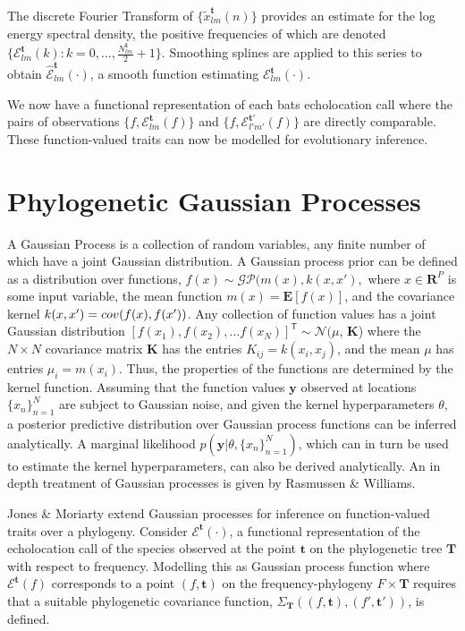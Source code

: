 \documentclass[wsdraft]{ws-rv9x6} %
\begin{document}
The discrete Fourier Transform\cite{antoniou2006digital}
of \(\{\tilde{x}_{lm}^{\mathbf{t}}(n)\}\) provides an estimate for the log energy spectral density, the positive frequencies of which are denoted \(\{\mathcal{E}_{lm}^{\mathbf{t}}(k) : k = 0, \dots, \frac{ N_{lm}^{\mathbf{t}}}{2} + 1\}\). Smoothing splines\cite{friedman2001elements} are applied to this series to obtain \(\hat{\mathcal{E}}_{lm}^{\mathbf{t}}(\cdot)\), a smooth function estimating \(\mathcal{E}_{lm}^{\mathbf{t}}(\cdot)\).

We now have a functional representation of each bats echolocation call where the pairs of observations \(\{f, \mathcal{E}_{lm}^{\mathbf{t}}(f)\}\) and \(\{f, \mathcal{E}_{l'm'}^{{\mathbf{t}}'}(f)\}\) are directly comparable. These function-valued traits can now be modelled for evolutionary inference.

\section{Phylogenetic Gaussian Processes}
A Gaussian Process is a collection of random variables, any finite number of which have a joint Gaussian distribution. A Gaussian process prior can be defined as a distribution over functions, \(f(x) \sim \mathcal{GP}(m(x), k (x, x'),\) where \(x \in \mathbf{R}^P\) is some input variable, the mean function \(m(x) = \mathbf{E}[f(x)]\), and the covariance kernel \(k(x, x') = \mathnormal{cov}(f(x), f(x') )\). Any collection of function values has a joint Gaussian distribution
\(
[f(x_1), f(x_2), \dots f(x_N)]^{\mathsf{T}} \sim \mathcal{N}(\)\boldmath\(\mu\)\unboldmath, \(\mathbf{K}
\))
where the \(N \times N\) covariance matrix \(\mathbf{K}\)  has the entries \(K_{ij} = k(x_i, x_j)\), and the mean \boldmath\(\mu\)\unboldmath\(\) has entries \(\mu_i = m(x_i)\). Thus, the properties of the functions are determined by the kernel function. Assuming that the function values \(\mathbf{y}\) observed at locations \(\{x_n\}_{n=1}^N\) are subject to Gaussian noise, and given the kernel hyperparameters \(\theta\), a posterior predictive distribution over Gaussian process functions can be inferred analytically. A marginal likelihood \(p(\mathbf{y} | \theta, \{x_n\}_{n=1}^N)\), which can in turn be used to estimate the kernel hyperparameters, can also be derived analytically. An in depth treatment of Gaussian processes is given by Rasmussen \& Williams.\cite{rasmussen2006gaussian}  

Jones \& Moriarty\cite{jones2013evolutionary} extend Gaussian processes for inference on function-valued traits over a phylogeny. Consider \(\mathcal{E}^{\mathbf{t}}(\cdot)\), a functional representation of the echolocation call of the species observed at the point \(\mathbf{t}\) on the phylogenetic tree \(\mathbf{T}\) with respect to frequency. Modelling this as Gaussian process function where \(\mathcal{E}^{\mathbf{t}}(f)\) corresponds to a point \((f, \mathbf{t})\) on the frequency-phylogeny \(F \times \mathbf{T}\) requires that a suitable phylogenetic covariance function, \(\Sigma_{\mathbf{T}}\left((f,\mathbf{t}), (f',\mathbf{t}')\right)\), is defined.
\end{document}

